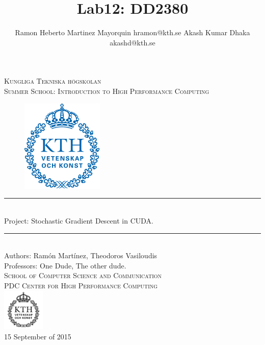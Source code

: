 \documentclass[11pt,a4paper]{article}
\title{Lab12: DD2380 }
\author{
Ramon Heberto Martinez Mayorquin  hramon@kth.se 
Akash Kumar Dhaka  akashd@kth.se 
}
\newcommand{\HRule}{\rule{\linewidth}{0.5mm}}
\begin{document}
\begin{titlepage}
\begin{center}

\textsc{\LARGE Kungliga Tekniska högskolan}\\[1.0cm]

\textsc{\Large Summer School: Introduction to High Performance Computing}\\[2.0cm]



\begin{figure}[H]
	\centering
 \includegraphics[width=0.35\textwidth]{Kth_logo.png}
\end{figure}
%

\HRule \\[0.4cm]
{ \huge  Project: Stochastic Gradient Descent in CUDA.
}\\[0.4cm]
\HRule \\[1.5cm]


Authors: Ram\'on  Mart\'inez, Theodoros Vasiloudis   \\ 
\large Professors: One Dude, The other dude.  \\ [2.5cm]

\textsc{\Large School of Computer Science and Communication \\
PDC Center for High Performance Computing}\\ [1.0cm] 
\includegraphics[width=0.15\textwidth]{KTH_black.png}\\[1.5cm] %
{\large 15 September of 2015}

\end{center}
\end{titlepage}
\end{document}
